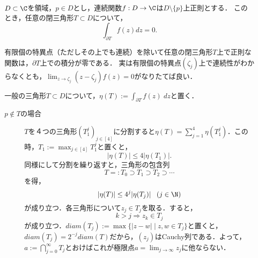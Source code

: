 \documentclass[uplatex, dvipdfmx]{jsreport}
\begin{document}
\begin{lemma}
    $D\subset\C$を領域，$p\in D$とし，連続関数$f:D\to\C$は$D\setminus\{p\}$上正則とする．
    このとき，任意の閉三角形$T\subset D$について，
    \[\int_{\partial T}f(z)dz=0.\]
\end{lemma}
\begin{remarks}
    有限個の特異点（ただしその上でも連続）を除いて任意の閉三角形$T$上で正則な関数は，$\partial T$上での積分が零である．
    実は有限個の特異点$(\zeta_j)$上で連続性がわからなくとも，$\lim_{z\to\zeta_j}(z-\zeta_j)f(z)=0$がなりたてば良い．
\end{remarks}
\begin{Proof}
    一般の三角形$T\subset D$について，$\eta(T):=\int_{\partial T}f(z)\;dz$と置く．
    \begin{description}
        \item[$p\notin T$の場合] $T$を４つの三角形$(T_1^j)_{j\in[4]}$に分割すると$\eta(T)=\sum^4_{j=1}\eta(T_1^j)$．この時，$T_1:=\max_{j\in[4]}T_1^j$と置くと，
        \[|\eta(T)|\le 4|\eta(T_1)|.\]
        同様にして分割を繰り返すと，三角形の包含列
        \[ T=:T_0\supset T_1\supset T_2\supset\cdots \]
        を得，
        \[ |\eta(T)|\le 4^{j}|\eta(T_j)|\;\;\;(j\in\N) \]
        が成り立つ．各三角形について$z_j\in T_j$を取る．すると，
        \[ k>j\Rightarrow z_k\in T_j \]
        が成り立つ．$diam(T_j):=\max\{|z-w|\mid z,w\in T_j\}$と置くと，$diam(T_j)=2^{-j}diam(T)$だから，$(z_j)$はCauchy列である．よって，$a:=\bigcap_{j=0}^\infty T_j$とおけばこれが極限点$a=\lim_{j\to\infty}z_j$に他ならない．


\end{description}
\end{Proof}
\end{document}
